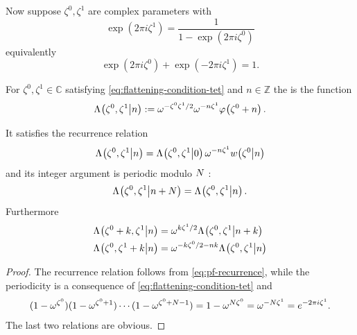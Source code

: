 \documentclass{sl2ams}
\numberwithin{equation}{section}
\newcommand{\CC}{\mathbb{C}}
\newcommand{\ZZ}{\mathbb{Z}}
\begin{document}
Now suppose \(\zeta^0, \zeta^1\) are complex parameters with
\begin{equation}
  \label{eq:flattening-condition-tet}
  \exp(2\pi i \zeta^1) = \frac{1}{1 - \exp(2\pi i \zeta^0)}
\end{equation}
equivalently
\[
  \exp(2\pi i \zeta^0) + \exp(-2\pi i \zeta^1) = 1.
\]
\begin{definition}
  \label{def:qlf}
  For \(\zeta^0, \zeta^1 \in \CC\) satisfying \eqref{eq:flattening-condition-tet} and  \(n \in \ZZ\)
  the  is the function
  \begin{equation}
    \label{eq:qlf-def}
    \qlf{\zeta^0, \zeta^1}{n} \defeq
    \omega^{-\zeta^0\zeta^1/2} 
    \omega^{-n \zeta^1}
    \pf{\zeta^0 + n}.
  \end{equation}
\end{definition}

\begin{proposition}
  It satisfies the recurrence relation
  \begin{equation}
      \qlf{\zeta^0, \zeta^1}{n}
      =
      \qlf{\zeta^0, \zeta^1}{0}
      \omega^{-n \zeta^1}
      \qlog{\zeta^0}{n}
  \end{equation}
  and its integer argument is periodic modulo \(N\) :
  \begin{equation}
    \qlf{\zeta^0, \zeta^1}{n + \nr}
    = 
    \qlf{\zeta^0, \zeta^1}{n}.
  \end{equation}
  Furthermore
  \begin{align}
    \label{eq:qlf-shift-0}
    \qlf{\zeta^0 + k, \zeta^1}{n}
    &=
    \omega^{k \zeta^1/2}
    \qlf{\zeta^0 , \zeta^1}{n + k}
    \\
    \label{eq:qlf-shift-1}
    \qlf{\zeta^0 , \zeta^1 + k}{n}
    &=
    \omega^{-k \zeta^0/2 - nk}
    \qlf{\zeta^0 , \zeta^1}{n}
  \end{align}
\end{proposition}
\begin{proof}
  The recurrence relation follows from \eqref{eq:pf-recurrence}, while the periodicity is a consequence of \eqref{eq:flattening-condition-tet} and
  \begin{equation}
    \label{eq:factorization-B}
    (1 - \omega^{\zeta^0})(1 - \omega^{\zeta^0 + 1}) \cdots (1 - \omega^{\zeta^0 + N -1}) = 1 - \omega^{N \zeta^0}
    =
    \omega^{-N \zeta^1}
    =
    e^{-2\pi i \zeta^1}.
  \end{equation}
  The last two relations are obvious.
\end{proof}
\end{document}
